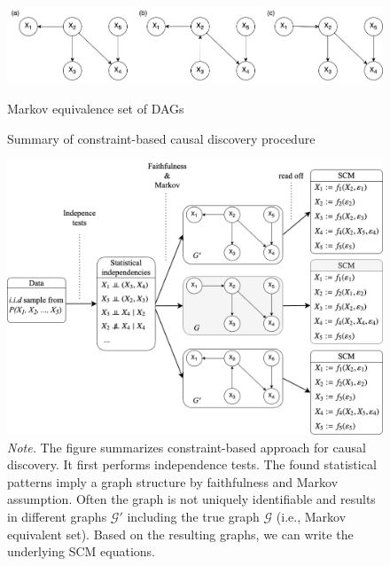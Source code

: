 \documentclass[11pt]{article}
\theoremstyle{definition}
\begin{document}
\begin{figure}[H]
    \centering
        \caption{Markov equivalence set of DAGs}
        \includegraphics[width=1.0\textwidth]{figures/dag_equiv.png}
    \label{fig:3}
\end{figure}



\begin{figure}[H]
    \centering
        \caption{Summary of constraint-based causal discovery procedure}
        \includegraphics[width=1.0\textwidth]{figures/CB_summary.png}
        \vspace{1mm}
        \caption*{\textit{Note.} The figure summarizes constraint-based approach for causal discovery. It first performs independence tests. The found statistical patterns imply a graph structure by faithfulness and Markov assumption. Often the graph is not uniquely identifiable and results in different graphs $\mathcal{G'}$ including the true graph $\mathcal{G}$ (i.e., Markov equivalent set). Based on the resulting graphs, we can write the underlying SCM equations.}
    \label{fig:4}
\end{figure}
\end{document}
